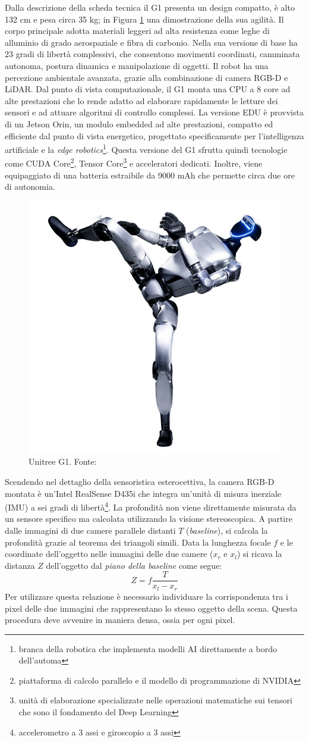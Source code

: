 Dalla descrizione della scheda tecnica \cite{unitreeManual2025} il G1 presenta un design compatto, è alto 132 cm e pesa circa 35 kg; in Figura \ref{fig:G1} una dimostrazione della sua agilità. Il corpo principale adotta materiali leggeri ad alta resistenza come leghe di alluminio di grado aerospaziale e fibra di carbonio. Nella sua versione di base ha 23 gradi di libertà complessivi, che consentono movimenti coordinati, camminata autonoma, postura dinamica e manipolazione di oggetti. Il robot ha una percezione ambientale avanzata, grazie alla combinazione di camera RGB-D e LiDAR. Dal punto di vista computazionale, il G1 monta una CPU a 8 core ad alte prestazioni che lo rende adatto ad elaborare rapidamente le letture dei sensori e ad attuare algoritmi di controllo complessi. La versione EDU è provvista di un Jetson Orin, un modulo embedded ad alte prestazioni, compatto ed efficiente dal punto di vista energetico, progettato specificamente per l'intelligenza artificiale e la \textit{edge robotics}\footnote{branca della robotica che implementa modelli AI direttamente a bordo dell'automa}. Questa versione del G1 sfrutta quindi tecnologie come CUDA Core\footnote{piattaforma di calcolo parallelo e il modello di programmazione di NVIDIA}, Tensor Core\footnote{unità di elaborazione specializzate nelle operazioni matematiche sui tensori che sono il fondamento del Deep Learning} e acceleratori dedicati. Inoltre, viene equipaggiato di una batteria estraibile da 9000 mAh che permette circa due ore di autonomia.

\begin{figure}[h]
    \centering
    \includegraphics[width=0.25\linewidth]{immagini/Unitree_G1.jpg}
    \caption{Unitree G1. Fonte: \cite{unitreeManual2025}}
    \label{fig:G1}
\end{figure}

Scendendo nel dettaglio della sensoristica esterocettiva, la camera RGB-D montata è un'Intel RealSense D435i che integra un'unità di misura inerziale (IMU) a sei gradi di libertà\footnote{accelerometro a 3 assi e giroscopio a 3 assi}. La profondità non viene direttamente misurata da un sensore specifico ma calcolata utilizzando la visione stereoscopica. A partire dalle immagini di due camere parallele distanti $T$ (\textit{baseline}), si calcola la profondità grazie al teorema dei triangoli simili. Data la lunghezza focale $f$ e le coordinate dell'oggetto nelle immagini delle due camere ($x_r$ e $x_l$) si ricava la distanza $Z$ dell'oggetto dal \textit{piano della baseline} come segue:
\begin{equation}
    Z=f\frac{T}{x_l-x_r}
\end{equation}
Per utilizzare questa relazione è necessario individuare la corrispondenza tra i pixel delle due immagini che rappresentano lo stesso oggetto della scena. Questa procedura deve avvenire in maniera densa, ossia per ogni pixel. 

